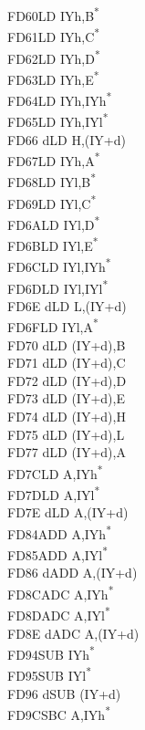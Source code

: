 \documentclass[twoside,openright,a4paper]{book}
\begin{document}
\begin{multicols}{3}
{\begin{tabbing}
	FD60\>LD IYh,B\textsuperscript{*}\\
	FD61\>LD IYh,C\textsuperscript{*}\\
	FD62\>LD IYh,D\textsuperscript{*}\\
	FD63\>LD IYh,E\textsuperscript{*}\\
	FD64\>LD IYh,IYh\textsuperscript{*}\\
	FD65\>LD IYh,IYl\textsuperscript{*}\\
	FD66 d\>LD H,(IY+d)\\
	FD67\>LD IYh,A\textsuperscript{*}\\
	FD68\>LD IYl,B\textsuperscript{*}\\
	FD69\>LD IYl,C\textsuperscript{*}\\
	FD6A\>LD IYl,D\textsuperscript{*}\\
	FD6B\>LD IYl,E\textsuperscript{*}\\
	FD6C\>LD IYl,IYh\textsuperscript{*}\\
	FD6D\>LD IYl,IYl\textsuperscript{*}\\
	FD6E d\>LD L,(IY+d)\\
	FD6F\>LD IYl,A\textsuperscript{*}\\
	FD70 d\>LD (IY+d),B\\
	FD71 d\>LD (IY+d),C\\
	FD72 d\>LD (IY+d),D\\
	FD73 d\>LD (IY+d),E\\
	FD74 d\>LD (IY+d),H\\
	FD75 d\>LD (IY+d),L\\
	FD77 d\>LD (IY+d),A\\
	FD7C\>LD A,IYh\textsuperscript{*}\\
	FD7D\>LD A,IYl\textsuperscript{*}\\
	FD7E d\>LD A,(IY+d)\\
	FD84\>ADD A,IYh\textsuperscript{*}\\
	FD85\>ADD A,IYl\textsuperscript{*}\\
	FD86 d\>ADD A,(IY+d)\\
	FD8C\>ADC A,IYh\textsuperscript{*}\\
	FD8D\>ADC A,IYl\textsuperscript{*}\\
	FD8E d\>ADC A,(IY+d)\\
	FD94\>SUB IYh\textsuperscript{*}\\
	FD95\>SUB IYl\textsuperscript{*}\\
	FD96 d\>SUB (IY+d)\\
	FD9C\>SBC A,IYh\textsuperscript{*}\\

\end{tabbing}}
\end{multicols}
\end{document}
